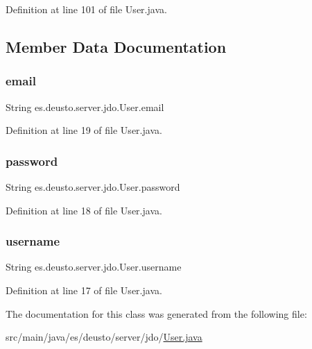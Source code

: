 Definition at line 101 of file User.\+java.



\subsection{Member Data Documentation}
\mbox{\label{classes_1_1deusto_1_1server_1_1jdo_1_1_user_a2aedb628a946e5044f27a3e6cbda31f0}} 
\subsubsection{\texorpdfstring{email}{email}}
{\footnotesize\ttfamily String es.\+deusto.\+server.\+jdo.\+User.\+email}



Definition at line 19 of file User.\+java.

\mbox{\label{classes_1_1deusto_1_1server_1_1jdo_1_1_user_a9e3d470b8d2b36996759bd0595984870}} 
\subsubsection{\texorpdfstring{password}{password}}
{\footnotesize\ttfamily String es.\+deusto.\+server.\+jdo.\+User.\+password}



Definition at line 18 of file User.\+java.

\mbox{\label{classes_1_1deusto_1_1server_1_1jdo_1_1_user_aa1f05a7b487224d7c846fb81e5262c00}} 
\subsubsection{\texorpdfstring{username}{username}}
{\footnotesize\ttfamily String es.\+deusto.\+server.\+jdo.\+User.\+username}



Definition at line 17 of file User.\+java.



The documentation for this class was generated from the following file\+:\begin{DoxyCompactItemize}
\item 
src/main/java/es/deusto/server/jdo/\hyperlink{_user_8java}{User.\+java}\end{DoxyCompactItemize}
